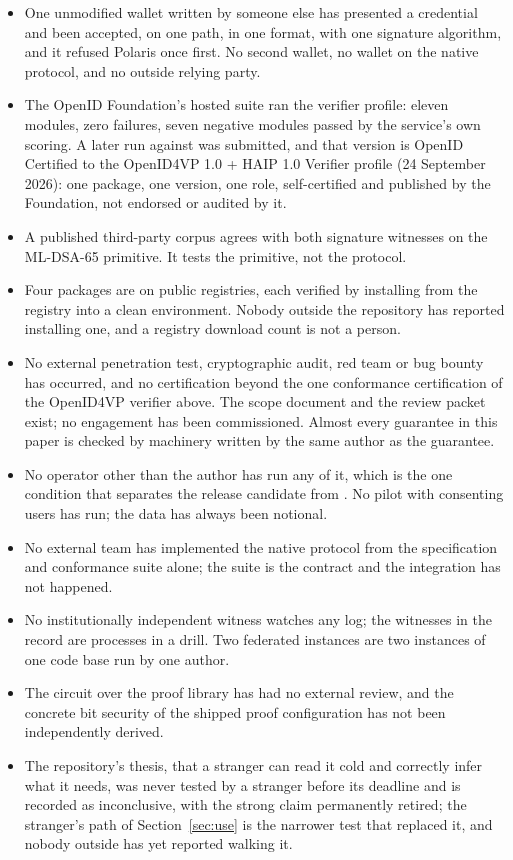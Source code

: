 \begin{itemize}
  \item One unmodified wallet written by someone else has presented a credential and been accepted,
    on one path, in one format, with one signature algorithm, and it refused Polaris once first.
    No second wallet, no wallet on the native protocol, and no outside relying party.
  \item The OpenID Foundation's hosted suite ran the verifier profile: eleven modules, zero failures,
    seven negative modules passed by the service's own scoring. A later run against
     was submitted, and that version is OpenID Certified to the
    OpenID4VP 1.0 + HAIP 1.0 Verifier profile (24 September 2026): one package, one version, one
    role, self-certified and published by the Foundation, not endorsed or audited by it.
  \item A published third-party corpus agrees with both signature witnesses on the ML-DSA-65
    primitive. It tests the primitive, not the protocol.
  \item Four packages are on public registries, each verified by installing from the registry into a
    clean environment. Nobody outside the repository has reported installing one, and a registry
    download count is not a person.
  \item No external penetration test, cryptographic audit, red team or bug bounty has occurred, and
    no certification beyond the one conformance certification of the OpenID4VP verifier above. The scope document and the review packet exist; no engagement has been
    commissioned. Almost every guarantee in this paper is checked by machinery written by the same
    author as the guarantee.
  \item No operator other than the author has run any of it, which is the one condition that
    separates the release candidate from . No pilot with consenting users has run; the
    data has always been notional.
  \item No external team has implemented the native protocol from the specification and conformance
    suite alone; the suite is the contract and the integration has not happened.
  \item No institutionally independent witness watches any log; the witnesses in the record are
    processes in a drill. Two federated instances are two instances of one code base run by one
    author.
  \item The circuit over the proof library has had no external review, and the concrete bit
    security of the shipped proof configuration has not been independently derived.
  \item The repository's thesis, that a stranger can read it cold and correctly infer what it
    needs, was never tested by a stranger before its deadline and is recorded as inconclusive, with
    the strong claim permanently retired; the stranger's path of Section~\ref{sec:use} is the
    narrower test that replaced it, and nobody outside has yet reported walking it.
\end{itemize}

